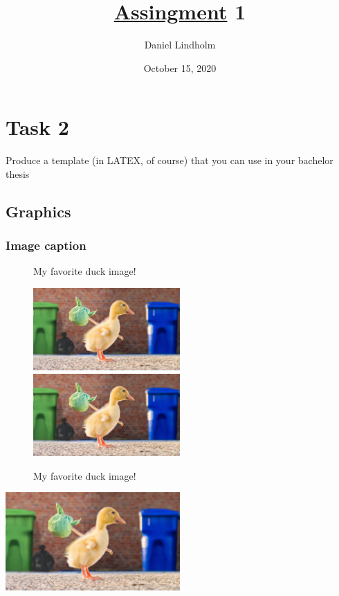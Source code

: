 \documentclass[a4paper]{article}
\title{\href{https://datsoftlyngby.github.io/soft2020fall/resources/8af56d7d-assignment-01.pdf}{Assingment} 1}
\author{Daniel Lindholm}
\date{October 15, 2020}
\begin{document}
\maketitle
\thispagestyle{empty}
\clearpage

\tableofcontents

\section{Task 2}
Produce a template (in LATEX, of course) that you can use in your bachelor
thesis

\subsection{Graphics}

\subsubsection{Image caption}
\begin{figure}[h!]
  \caption{My favorite duck image!}
  \includegraphics[width=0.5\textwidth]{duckz.jpg}
  \includegraphics[width=0.5\textwidth]{duckz.jpg}
  \caption{My favorite duck image!}
\end{figure}

\begin{center}
  \includegraphics[width=0.5\textwidth]{duckz.jpg}
  \label{fig:duck}
\end{center}
\end{document}
